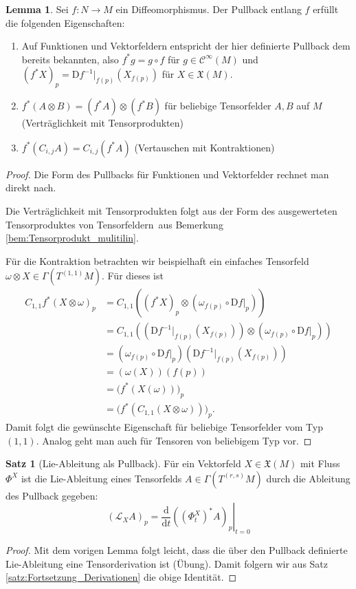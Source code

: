 \documentclass[a4paper]{scrbook}
\numberwithin{equation}{chapter}
\newcommand{\D}{\mathrm{d}}
\newcommand{\DD}{\mathrm{D}}
\newcommand{\sC}{\mathcal{C}^{\infty}}
\newcommand{\vf}{\mathfrak{X}}
\theoremstyle{definition}
\newtheorem{lemma}[defn]{Lemma}
\newtheorem{satz}[defn]{Satz}
\begin{document}
		\begin{lemma}
			Sei $f\colon N\to M$ ein Diffeomorphismus. Der Pullback entlang $f$ erfüllt die folgenden Eigenschaften:
			\begin{enumerate}[label=(\roman*)]
				\item Auf Funktionen und Vektorfeldern entspricht der hier definierte Pullback dem bereits bekannten, also $f^*g = g\circ f$ für $g\in\sC(M)$ und $(f^*X)_p = \DD f^{-1}|_{f(p)} (X_{f(p)})$ für $X \in \vf(M)$.
				\item $f^*(A\otimes B) = (f^*A) \otimes (f^*B)$ für beliebige Tensorfelder $A,B$ auf $M$ (Verträglichkeit mit Tensorprodukten)
				\item $f^*(C_{i,j}A) = C_{i,j}(f^*A)$ (Vertauschen mit Kontraktionen)
			\end{enumerate}
			
			\begin{proof}
				Die Form des Pullbacks für Funktionen und Vektorfelder rechnet man direkt nach.
				
				Die Verträglichkeit mit Tensorprodukten folgt aus der Form des \glqq ausgewerteten Tensorproduktes von Tensorfeldern\grqq\ aus Bemerkung \ref{bem:Tensorprodukt_mulitilin}.
				
				Für die Kontraktion betrachten wir beispielhaft ein einfaches Tensorfeld $\omega \otimes X \in \Gamma(T^{(1,1)}M)$. Für dieses ist
				\begin{align*}
					C_{1,1}f^*(X\otimes\omega)_p &= C_{1,1} \left( (f^*X)_p \otimes \left(\omega_{f(p)} \circ \DD f\vert_p \right) \right)\\
					&= C_{1,1} \left( \left(\DD f^{-1}|_{f(p)} (X_{f(p)})\right) \otimes \left(\omega_{f(p)} \circ \DD f\vert_p \right) \right)\\
					&= \left(\omega_{f(p)} \circ \DD f\vert_p \right) \left(\DD f^{-1}|_{f(p)} (X_{f(p)})\right)\\
					&= (\omega(X))(f(p))\\
					&= \Big( f^*(X(\omega)) \Big)_p\\
					&= \Big( f^*(C_{1,1}(X\otimes\omega)) \Big)_p.
				\end{align*}
				Damit folgt die gewünschte Eigenschaft für beliebige Tensorfelder vom Typ $(1,1)$. Analog geht man auch für Tensoren von beliebigem Typ vor.
			\end{proof}
		\end{lemma}
		
		\begin{satz}[Lie-Ableitung als Pullback]
			Für ein Vektorfeld $X\in\vf(M)$ mit Fluss $\Phi^X$ ist die Lie-Ableitung eines Tensorfelds $A\in \Gamma(T^{(r,s)}M)$ durch die Ableitung des Pullback gegeben:
			\[(\mathcal{L}_X A)_p = \left.\frac{\D}{\D t} \left((\Phi^X_t)^*A\right)_p \right|_{t=0}\]
			\begin{proof}
				Mit dem vorigen Lemma folgt leicht, dass die über den Pullback definierte Lie-Ableitung eine Tensorderivation ist (Übung). Damit folgern wir aus Satz \ref{satz:Fortsetzung_Derivationen} die obige Identität.
			\end{proof}
		\end{satz}
\end{document}

